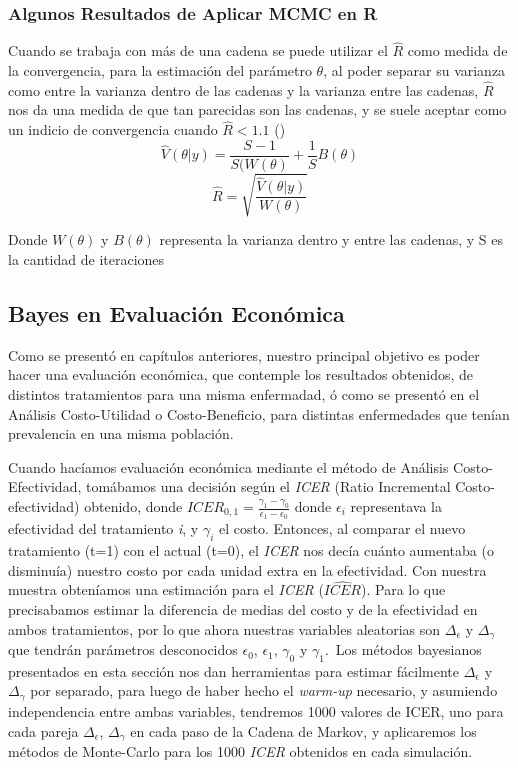 \documentclass[12pt]{article}
\begin{document}
\subsubsection{Algunos Resultados de Aplicar MCMC en R}

Cuando se trabaja con más de una cadena se puede utilizar el $\hat{R}$ como medida de la convergencia, para la estimación del parámetro $\theta$, al poder separar su varianza como entre la varianza dentro de las cadenas y la varianza entre las cadenas, $\hat{R}$ nos da una medida de que tan parecidas son las cadenas, y se suele aceptar como un indicio de convergencia cuando $\hat{R}<1.1$ (\cite{baio_bayesian_2017})\\

\[
\widehat{V}(\theta|y)  = \frac{S-1}{S(W(\theta)} + \frac{1}{S}B(\theta)
\]
\[
\hat{R} = \sqrt{\frac{\widehat{V}(\theta|y)}{W(\theta)}}
\]

Donde $W(\theta)$ y $B(\theta)$ representa la varianza dentro y entre las cadenas, y S es la cantidad de iteraciones

\subsection{Bayes en Evaluación Económica} 

Como se presentó en capítulos anteriores, nuestro principal objetivo es poder hacer una evaluación económica, que contemple los resultados obtenidos, de distintos tratamientos para una misma enfermadad, ó como se presentó en el Análisis Costo-Utilidad o Costo-Beneficio, para distintas enfermedades que tenían prevalencia en una misma población.\

Cuando hacíamos evaluación económica mediante el método de Análisis Costo-Efectividad, tomábamos una decisión según el \textit{ICER} (Ratio Incremental Costo-efectividad) obtenido, donde $ICER_{0,1}=\frac{\gamma_1-\gamma_0}{\epsilon_1-\epsilon_0}$ donde $\epsilon_i$ representava la efectividad del tratamiento \textit{i}, y $\gamma_i$ el costo. Entonces, al comparar el nuevo tratamiento (t=1) con el actual (t=0), el \textit{ICER} nos decía cuánto aumentaba (o disminuía) nuestro costo por cada unidad extra en la efectividad. Con nuestra muestra obteníamos una estimación para el \textit{ICER} ($\widehat{ICER}$). Para lo que precisabamos estimar la diferencia de medias del costo y de la efectividad en ambos tratamientos, por lo que ahora nuestras variables aleatorias son $\Delta_\epsilon$ y $\Delta_\gamma$ que tendrán parámetros desconocidos $\epsilon_0$, $\epsilon_1$, $\gamma_0$ y $\gamma_1$.\
Los métodos bayesianos presentados en esta sección nos dan herramientas para estimar fácilmente $\Delta_\epsilon$ y $\Delta_\gamma$ por separado, para luego de haber hecho el \textit{warm-up} necesario, y asumiendo independencia entre ambas variables, tendremos 1000 valores de ICER, uno para cada pareja $\Delta_\epsilon$, $\Delta_\gamma$ en cada paso de la Cadena de Markov, y aplicaremos los métodos de Monte-Carlo para los 1000 \textit{ICER} obtenidos en cada simulación. 
\end{document}
